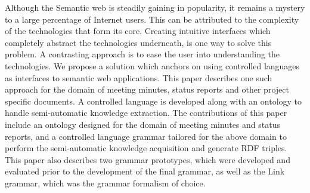 Although the Semantic web is steadily gaining in popularity, it remains a mystery to a large percentage of Internet users. This can be attributed to the complexity of the technologies that form its core. Creating intuitive interfaces which completely abstract the technologies underneath, is one way to solve this problem. A contrasting approach is to ease the user into understanding the technologies. We propose a solution which anchors on using controlled languages as interfaces to semantic web applications. This paper describes one such approach for the domain of meeting minutes, status reports and other project specific documents. A controlled language is developed along with an ontology to handle semi-automatic knowledge extraction. The contributions of this paper include an ontology designed for the domain of meeting minutes and status reports, and a controlled language grammar tailored for the above domain to perform the semi-automatic knowledge acquisition and generate RDF triples. This paper also describes two grammar prototypes, which were developed and evaluated prior to the development of the final grammar, as well as the Link grammar, which was the grammar formalism of choice. 
